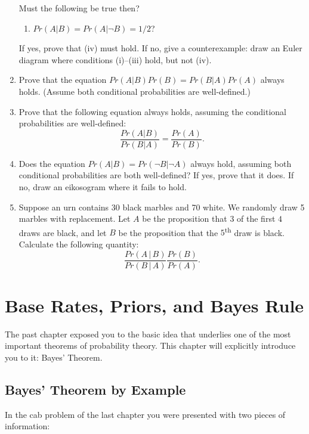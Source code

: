 \documentclass[]{tufte-book}
\providecommand{\tightlist}{%
  \setlength{\itemsep}{0pt}\setlength{\parskip}{0pt}}
\begin{document}
\begin{enumerate}
  Must the following be true then?

  \begin{enumerate}
  \def\labelenumii{\roman{enumii}.}
  \setcounter{enumii}{3}
  \tightlist
  \item
    \(Pr(A | B) = Pr(A | \neg B) = 1/2\)?
  \end{enumerate}

  If yes, prove that (iv) must hold. If no, give a counterexample: draw an Euler diagram where conditions (i)--(iii) hold, but not (iv).
\item
  Prove that the equation \(Pr(A | B) Pr(B) = Pr(B | A) Pr(A)\) always holds. (Assume both conditional probabilities are well-defined.)
\item
  Prove that the following equation always holds, assuming the conditional probabilities are well-defined:
  \[ \frac{Pr(A | B)}{Pr(B | A)} = \frac{Pr(A)}{Pr(B)}. \]
\item
  Does the equation \(Pr(A | B) = Pr(\neg B | \neg A)\) always hold, assuming both conditional probabilities are both well-defined? If yes, prove that it does. If no, draw an eikosogram where it fails to hold.
\item
  Suppose an urn contains 30 black marbles and 70 white. We randomly draw 5 marbles with replacement. Let \(A\) be the proposition that \(3\) of the first \(4\) draws are black, and let \(B\) be the proposition that the \(5\)\textsuperscript{th} draw is black. Calculate the following quantity:
  \[ \frac{Pr(A \,\vert\, B)}{Pr(B \,\vert\, A)} \frac{Pr(B)}{Pr(A)}. \]
\end{enumerate}

\hypertarget{base-rates-priors-and-bayes-rule}{%
\chapter{Base Rates, Priors, and Bayes Rule}\label{base-rates-priors-and-bayes-rule}}

The past chapter exposed you to the basic idea that underlies one of the most important theorems of probability theory. This chapter will explicitly introduce you to it: Bayes' Theorem.

\hypertarget{bayes-theorem-by-example}{%
\section{Bayes' Theorem by Example}\label{bayes-theorem-by-example}}

In the cab problem of the last chapter you were presented with two pieces of information:
\end{document}
